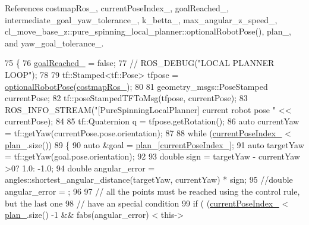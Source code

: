References costmap\+Ros\+\_\+, current\+Pose\+Index\+\_\+, goal\+Reached\+\_\+, intermediate\+\_\+goal\+\_\+yaw\+\_\+tolerance\+\_\+, k\+\_\+betta\+\_\+, max\+\_\+angular\+\_\+z\+\_\+speed\+\_\+, cl\+\_\+move\+\_\+base\+\_\+z\+::pure\+\_\+spinning\+\_\+local\+\_\+planner\+::optional\+Robot\+Pose(), plan\+\_\+, and yaw\+\_\+goal\+\_\+tolerance\+\_\+.


\begin{DoxyCode}
75 \{
76   \hyperlink{classcl__move__base__z_1_1pure__spinning__local__planner_1_1PureSpinningLocalPlanner_aecfe0dfc68b8c8e461e8b684e5fa4d2f}{goalReached\_} = \textcolor{keyword}{false};
77   \textcolor{comment}{// ROS\_DEBUG("LOCAL PLANNER LOOP");}
78 
79   tf::Stamped<tf::Pose> tfpose = \hyperlink{namespacecl__move__base__z_1_1pure__spinning__local__planner_a6ae763fceb009e0c477171fefe74b4fc}{optionalRobotPose}(\hyperlink{classcl__move__base__z_1_1pure__spinning__local__planner_1_1PureSpinningLocalPlanner_a63f75481071df118d56e8b652e68b002}{costmapRos\_});
80 
81   geometry\_msgs::PoseStamped currentPose;
82   tf::poseStampedTFToMsg(tfpose, currentPose);
83   ROS\_INFO\_STREAM(\textcolor{stringliteral}{"[PureSpinningLocalPlanner] current robot pose "} << currentPose);
84 
85   tf::Quaternion q = tfpose.getRotation();
86   \textcolor{keyword}{auto} currentYaw = tf::getYaw(currentPose.pose.orientation);
87 
88   \textcolor{keywordflow}{while} (\hyperlink{classcl__move__base__z_1_1pure__spinning__local__planner_1_1PureSpinningLocalPlanner_aa0f9b4cf52a76e44dc2cfc5103d52dcd}{currentPoseIndex\_} < \hyperlink{classcl__move__base__z_1_1pure__spinning__local__planner_1_1PureSpinningLocalPlanner_a31875ee78bae4698b579e20c0754860d}{plan\_}.size())
89   \{
90     \textcolor{keyword}{auto} &goal = \hyperlink{classcl__move__base__z_1_1pure__spinning__local__planner_1_1PureSpinningLocalPlanner_a31875ee78bae4698b579e20c0754860d}{plan\_}[\hyperlink{classcl__move__base__z_1_1pure__spinning__local__planner_1_1PureSpinningLocalPlanner_aa0f9b4cf52a76e44dc2cfc5103d52dcd}{currentPoseIndex\_}];
91     \textcolor{keyword}{auto} targetYaw = tf::getYaw(goal.pose.orientation);
92 
93     \textcolor{keywordtype}{double} sign = targetYaw - currentYaw >0? 1.0: -1.0;
94     \textcolor{keywordtype}{double} angular\_error = angles::shortest\_angular\_distance(targetYaw, currentYaw) * sign;
95     \textcolor{comment}{//double angular\_error = ;}
96 
97     \textcolor{comment}{// all the points must be reached using the control rule, but the last one}
98     \textcolor{comment}{// have an special condition}
99     \textcolor{keywordflow}{if} ( (\hyperlink{classcl__move__base__z_1_1pure__spinning__local__planner_1_1PureSpinningLocalPlanner_aa0f9b4cf52a76e44dc2cfc5103d52dcd}{currentPoseIndex\_} < \hyperlink{classcl__move__base__z_1_1pure__spinning__local__planner_1_1PureSpinningLocalPlanner_a31875ee78bae4698b579e20c0754860d}{plan\_}.size() -1 && fabs(angular\_error) < this->

\end{DoxyCode}

